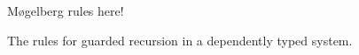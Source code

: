 \begin{figure}[h]
  Møgelberg rules here!
  \caption{The rules for guarded recursion in a dependently typed system.}
  \label{fig:guarded_recursion_dependent_rules}
\end{figure}


